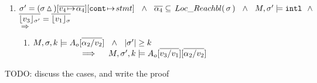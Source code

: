 \begin{lemma}
\begin{enumerate}
\begin{enumerate}
\end{enumerate}

\item
\label{l:calls:caller}
$\sigma'= (\sigma \popSymbol)[\overline{ v_4\! \mapsto\! \alpha_4}][\prg{cont}\!\mapsto\! stmt]
\ \ \wedge \ \  \overline {\alpha_4} \subseteq \LRelevantO \sigma  \ \ \wedge \ \  M, \sigma' \models \intThis
 \ \ \wedge $\\
 $ \overline {\interpret {\sigma'}  {v_3} } = \overline {\interpret {\sigma} {v_1} }$ 
\\ 
$\Longrightarrow$
 

\begin{enumerate}
\item
\label{l:calls:caller:one}
$\satDAssertFrom M  \sigma k   \Ao[\overline {\alpha_2/v_2}] \ \  \wedge\ \ \DepthSt {\sigma'} \geq k  \ 
$ \\ 
$\strut \hspace{2cm}  \hfill \Longrightarrow  \ \ \  \   \satDAssertFrom M  {\sigma'} k   {\Ao[\overline {v_3 / v_1}][\overline { \alpha_2 / v_2}]}$ 

%
%
 \end{enumerate}
\end{enumerate}

\end{lemma}


TODO: discuss the cases, and write the proof

